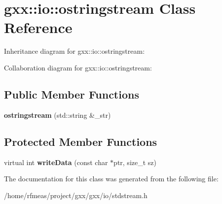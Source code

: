\hypertarget{classgxx_1_1io_1_1ostringstream}{}\section{gxx\+:\+:io\+:\+:ostringstream Class Reference}
\label{classgxx_1_1io_1_1ostringstream}


Inheritance diagram for gxx\+:\+:io\+:\+:ostringstream\+:


Collaboration diagram for gxx\+:\+:io\+:\+:ostringstream\+:
\subsection*{Public Member Functions}
\begin{DoxyCompactItemize}
\item 
{\bfseries ostringstream} (std\+::string \&\+\_\+str)\hypertarget{classgxx_1_1io_1_1ostringstream_af7608368f8b0bd4866a541b80c2b46aa}{}\label{classgxx_1_1io_1_1ostringstream_af7608368f8b0bd4866a541b80c2b46aa}

\end{DoxyCompactItemize}
\subsection*{Protected Member Functions}
\begin{DoxyCompactItemize}
\item 
virtual int {\bfseries write\+Data} (const char $\ast$ptr, size\+\_\+t sz)\hypertarget{classgxx_1_1io_1_1ostringstream_a50ad66ef01ddb0e64a50635fc5039830}{}\label{classgxx_1_1io_1_1ostringstream_a50ad66ef01ddb0e64a50635fc5039830}

\end{DoxyCompactItemize}


The documentation for this class was generated from the following file\+:\begin{DoxyCompactItemize}
\item 
/home/rfmeas/project/gxx/gxx/io/stdstream.\+h\end{DoxyCompactItemize}
